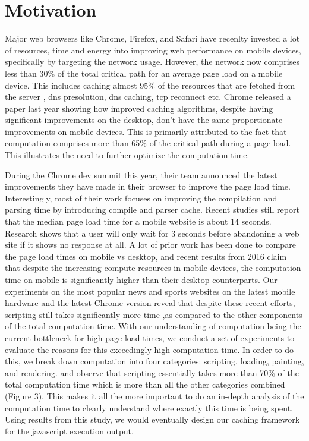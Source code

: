 \section{Motivation}
\label{sec:motivation}


Major web browsers like Chrome, Firefox, and Safari have recenlty invested a lot of resources,
time and energy into improving web performance on mobile devices, specifically by targeting 
the network usage. However, the network now comprises less than 30\% \cite{njait2016www} of the total critical
path for an average page load on a mobile device. This includes caching almost 95\% of the
resources that are fetched from the server \cite{vesuna2016caching}, dns presolution, dns caching, tcp reconnect etc.
Chrome released a paper last year showing how improved caching algorithms, despite having 
significant improvements on the desktop, don't have the same proportionate improvements 
on mobile devices. This is primarily attributed to the fact that computation comprises more than 65\%
of the critical path during a page load. This illustrates the need to further optimize the computation 
time. 

During the Chrome dev summit this year, their team announced the latest improvements they have 
made in their browser to improve the page load time. Interestingly, most of their work focuses on
improving the compilation and parsing time by introducing compile and parser cache. 
Recent studies \cite{url4} still report that the median page load time for a mobile website 
is about 14 seconds. Research \cite{url4} shows that a user will only wait for 3 seconds 
before abandoning a web site if it shows no response at all. A lot of prior work \cite {njait2016www}
has been done to compare the page load times on mobile vs desktop, and recent results
from 2016 claim that despite the increasing compute resources in mobile devices,
the computation time on mobile is significantly higher than their desktop counterparts. 
 Our experiments
on the most popular news and sports websites on the latest mobile hardware and the latest 
Chrome version reveal that despite these recent efforts, scripting still takes significantly more
time ,as compared to the other components of the total computation time. With our understanding of 
computation being the current bottleneck for high page load times, 
we conduct a set of experiments to evaluate the reasons for this
exceedingly high computation time. In order to do this, we break down computation
into four categories: scripting, loading, painting, and rendering.
and observe that scripting essentially takes more than 70\% of the total
computation time which is more than all the other categories combined (Figure 3). 
This makes it all the more important to do an in-depth analysis of the computation time to clearly
understand where exactly this time is being spent. Using results from this study, we would eventually
design our caching framework for the javascript execution output. 
